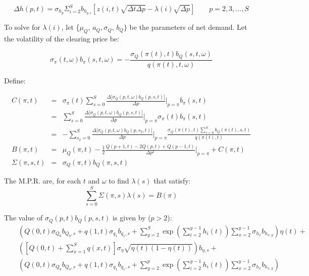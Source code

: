 \documentclass{article}
\begin{document}
$$
\Delta h(p,t) = \sigma_{h_p} \Sigma_{i=2}^{S} b_{h_{p, i}} [z(i,t) \sqrt{\Delta t \Delta p} - \lambda(i)\sqrt{\Delta p}] \qquad p = 2, 3, \ldots, S
$$

To solve for $\lambda(i)$, let \{$\mu _{Q}$, $a_{Q},\sigma _{Q}$, $b_{Q}\}$ be the parameters of net demand.
Let the volatility of the clearing price be:

\begin{equation*}
\sigma _{\pi }(t,\omega )b_{\pi }(s,t,\omega )=-\frac{\sigma _{Q}(\pi
(t),t)b_{Q}(s,t,\omega )}{q(\pi (t),t,\omega )}
\end{equation*}
\bigskip

Define:

\begin{eqnarray*}
C(\pi ,t) &=&\sigma _{\pi }(t)\sum_{s=0}^{S}\frac{\Delta \lbrack \sigma_{Q}(p,t,\omega )b_{Q}(p,s,t)]}{\Delta p}|_{p=\pi }b_{\pi }(s,t) \\
&=&\sum_{s=0}^{S}\frac{\Delta \lbrack \sigma _{Q}(p,t,\omega )b_{Q}(p,s,t)]}{\Delta p}|_{p=\pi }\sigma _{\pi }(t)b_{\pi }(s,t) \\
&=&-\sum_{s_{2}=0}^{S}\frac{\Delta \lbrack \sigma _{Q}(p,t,\omega)b_{Q}(p,s_{2},t)]}{\Delta p}|_{p=\pi }\frac{\sigma _{Q}(\pi(t),t)\sum_{s=0}^{S}b_{Q}(\pi (t),s,t)}{q(\pi (t),t)} \\
B(\pi ,t) &=&\mu _{Q}(\pi ,t)-\frac{1}{2}\frac{Q(p+1,t) - 2Q(p,t) + Q(p-1,t)}{\Delta p^{2}}|_{p=\pi }+C(\pi ,t) \\
\Sigma (\pi ,s,t) &=&\sigma _{Q}(\pi ,t)b_{Q}(\pi ,s,t)
\end{eqnarray*}
\bigskip

The M.P.R. are, for each $t$ and $\omega $ to find $\lambda (s)$ that
satisfy:%
\begin{equation*}
\sum_{s=0}^{S}\Sigma (\pi ,s)\lambda (s) = B(\pi )
\end{equation*}

The value of $\sigma _{Q}(p,t)b_{Q}(p,s,t)$ is given by ($p > 2$):%
\begin{eqnarray*}
&&\left( Q(0,t)\sigma _{Q_{0}}b_{Q_{0},s}+q(1,t)\sigma _{q_{1}}b_{q_{1},s}+\sum_{y=2}^{S}\exp
(\sum_{i=2}^{y-1}h_{i}(t))\sum_{x=2}^{y-1}\sigma_{h_{x}}b_{h_{x,y}}\right) \eta (t)+ \\
&&\left( [Q(0,t)+\sum_{x=1}^{S}q(x,t)]\sigma _{\eta }\sqrt{\eta (t)(1-\eta
(t))}\right) b_{\eta ,s}+ \\
&&\left( Q(0,t)\sigma_{Q_{0}}b_{Q_{0},s}+q(1,t)\sigma_{q_{1}}b_{q_{1},s}+\sum_{y=2}^{p}\exp
(\sum_{i=2}^{y-1}h_{i}(t))\sum_{x=2}^{y-1}\sigma_{h_{x}}b_{h_{x,y}}\right)
\end{eqnarray*}
\end{document}
